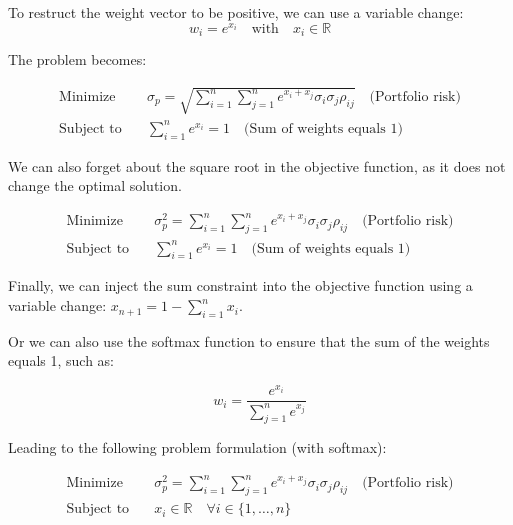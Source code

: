\documentclass[12pt]{article}
\begin{document}

To restruct the weight vector to be positive, we can use a variable change:
\begin{equation}
    w_i = e^{x_i} \quad \text{with} \quad x_i \in \mathbb{R}
\end{equation}

The problem becomes:

\begin{equation}
    \begin{aligned}
        \text{Minimize} \quad   & \sigma_p = \sqrt{\sum_{i=1}^{n}\sum_{j=1}^{n} e^{x_i + x_j} \sigma_i \sigma_j \rho_{ij}} \quad \text{(Portfolio risk)} \\
        \text{Subject to} \quad & \sum_{i=1}^{n} e^{x_i} = 1 \quad \text{(Sum of weights equals 1)}    
    \end{aligned}
\end{equation}

We can also forget about the square root in the objective function, as it does not change the optimal solution.

\begin{equation}
    \begin{aligned}
        \text{Minimize} \quad   & \sigma_p^2 = \sum_{i=1}^{n}\sum_{j=1}^{n} e^{x_i + x_j} \sigma_i \sigma_j \rho_{ij} \quad \text{(Portfolio risk)} \\
        \text{Subject to} \quad & \sum_{i=1}^{n} e^{x_i} = 1 \quad \text{(Sum of weights equals 1)}    
    \end{aligned}
\end{equation}

Finally, we can inject the sum constraint into the objective function using a variable change: 
$x_{n+1} = 1 - \sum_{i=1}^{n} x_i$.

Or we can also use the softmax function to ensure that the sum of the weights equals 1, such as:

\begin{equation}
    w_i = \frac{e^{x_i}}{\sum_{j=1}^{n} e^{x_j}}
\end{equation}

Leading to the following problem formulation (with softmax):

\begin{equation}
    \begin{aligned}
        \text{Minimize} \quad   & \sigma_p^2 = \sum_{i=1}^{n}\sum_{j=1}^{n} e^{x_i + x_j} \sigma_i \sigma_j \rho_{ij} \quad \text{(Portfolio risk)} \\
        \text{Subject to} \quad & x_i \in \mathbb{R} \quad \forall i \in \{1, \ldots, n\} \\
    \end{aligned}
\end{equation}
\end{document}
